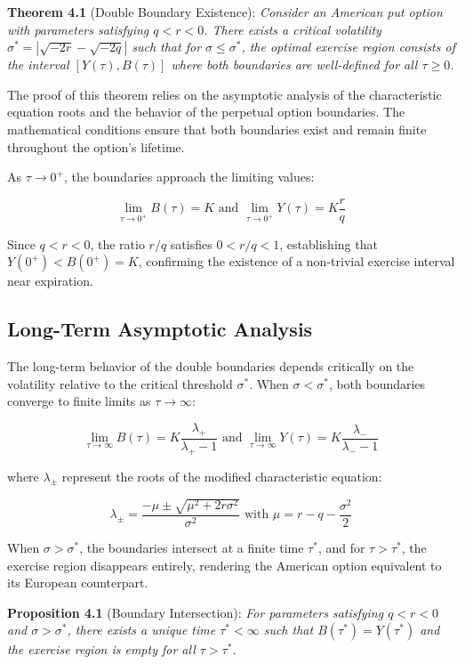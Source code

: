 \documentclass[
  american,
  11pt,
  11pt,
  letterpaper,
  onecolumn]{article}
\begin{document}
\textbf{Theorem 4.1} (Double Boundary Existence): \emph{Consider an
American put option with parameters satisfying \(q < r < 0\). There
exists a critical volatility \(\sigma^* = |\sqrt{-2r} - \sqrt{-2q}|\)
such that for \(\sigma \leq \sigma^*\), the optimal exercise region
consists of the interval \([Y(\tau), B(\tau)]\) where both boundaries
are well-defined for all \(\tau \geq 0\).}

The proof of this theorem relies on the asymptotic analysis of the
characteristic equation roots and the behavior of the perpetual option
boundaries. The mathematical conditions ensure that both boundaries
exist and remain finite throughout the option's lifetime.

As \(\tau \to 0^+\), the boundaries approach the limiting values:

\[\lim_{\tau \to 0^+} B(\tau) = K \text{ and } \lim_{\tau \to 0^+} Y(\tau) = K \frac{r}{q} \tag{4.1}\]

Since \(q < r < 0\), the ratio \(r/q\) satisfies \(0 < r/q < 1\),
establishing that \(Y(0^+) < B(0^+) = K\), confirming the existence of a
non-trivial exercise interval near expiration.

\subsection{Long-Term Asymptotic
Analysis}\label{long-term-asymptotic-analysis}

The long-term behavior of the double boundaries depends critically on
the volatility relative to the critical threshold \(\sigma^*\). When
\(\sigma < \sigma^*\), both boundaries converge to finite limits as
\(\tau \to \infty\):

\[\lim_{\tau \to \infty} B(\tau) = K \frac{\lambda_+}{\lambda_+ - 1} \text{ and } \lim_{\tau \to \infty} Y(\tau) = K \frac{\lambda_-}{\lambda_- - 1} \tag{4.2}\]

where \(\lambda_{\pm}\) represent the roots of the modified
characteristic equation:

\[\lambda_{\pm} = \frac{-\mu \pm \sqrt{\mu^2 + 2r\sigma^2}}{\sigma^2} \text{ with } \mu = r - q - \frac{\sigma^2}{2} \tag{4.3}\]

When \(\sigma > \sigma^*\), the boundaries intersect at a finite time
\(\tau^*\), and for \(\tau > \tau^*\), the exercise region disappears
entirely, rendering the American option equivalent to its European
counterpart.

\textbf{Proposition 4.1} (Boundary Intersection): \emph{For parameters
satisfying \(q < r < 0\) and \(\sigma > \sigma^*\), there exists a
unique time \(\tau^* < \infty\) such that \(B(\tau^*) = Y(\tau^*)\) and
the exercise region is empty for all \(\tau > \tau^*\).}
\end{document}
